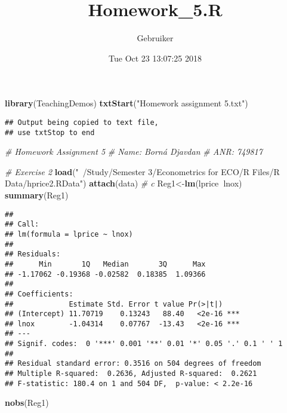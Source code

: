 \documentclass[]{article}
\title{Homework\_5.R}
\author{Gebruiker}
\date{Tue Oct 23 13:07:25 2018}
\newenvironment{Shaded}{\begin{snugshade}}{\end{snugshade}}
\newcommand{\CommentTok}[1]{\textcolor[rgb]{0.56,0.35,0.01}{\textit{#1}}}
\newcommand{\KeywordTok}[1]{\textcolor[rgb]{0.13,0.29,0.53}{\textbf{#1}}}
\newcommand{\NormalTok}[1]{#1}
\newcommand{\OperatorTok}[1]{\textcolor[rgb]{0.81,0.36,0.00}{\textbf{#1}}}
\newcommand{\StringTok}[1]{\textcolor[rgb]{0.31,0.60,0.02}{#1}}
\begin{document}
\maketitle

\begin{Shaded}
\begin{Highlighting}[]
\KeywordTok{library}\NormalTok{(TeachingDemos)}
\KeywordTok{txtStart}\NormalTok{(}\StringTok{"Homework assignment 5.txt"}\NormalTok{)}
\end{Highlighting}
\end{Shaded}

\begin{verbatim}
## Output being copied to text file,
## use txtStop to end
\end{verbatim}

\begin{Shaded}
\begin{Highlighting}[]
\CommentTok{# Homework Assignment 5}
\CommentTok{# Name: Borná Djavdan }
\CommentTok{# ANR: 749817}

\CommentTok{# Exercise 2}
\KeywordTok{load}\NormalTok{(}\StringTok{"~/Study/Semester 3/Econometrics for ECO/R Files/R Data/hprice2.RData"}\NormalTok{)}
\KeywordTok{attach}\NormalTok{(data)}
\CommentTok{# c}
\NormalTok{Reg1<-}\KeywordTok{lm}\NormalTok{(lprice}\OperatorTok{~}\NormalTok{lnox)}
\KeywordTok{summary}\NormalTok{(Reg1)}
\end{Highlighting}
\end{Shaded}

\begin{verbatim}
## 
## Call:
## lm(formula = lprice ~ lnox)
## 
## Residuals:
##      Min       1Q   Median       3Q      Max 
## -1.17062 -0.19368 -0.02582  0.18385  1.09366 
## 
## Coefficients:
##             Estimate Std. Error t value Pr(>|t|)    
## (Intercept) 11.70719    0.13243   88.40   <2e-16 ***
## lnox        -1.04314    0.07767  -13.43   <2e-16 ***
## ---
## Signif. codes:  0 '***' 0.001 '**' 0.01 '*' 0.05 '.' 0.1 ' ' 1
## 
## Residual standard error: 0.3516 on 504 degrees of freedom
## Multiple R-squared:  0.2636, Adjusted R-squared:  0.2621 
## F-statistic: 180.4 on 1 and 504 DF,  p-value: < 2.2e-16
\end{verbatim}

\begin{Shaded}
\begin{Highlighting}[]
\KeywordTok{nobs}\NormalTok{(Reg1)}
\end{Highlighting}
\end{Shaded}
\end{document}
